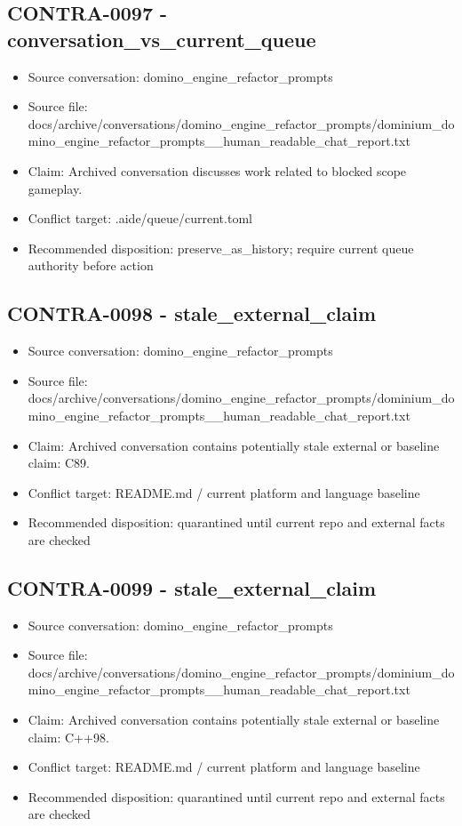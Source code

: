 \documentclass[11pt,a4paper]{report}
\begin{document}
\subsection{CONTRA-0097 - conversation\_vs\_current\_queue}

\begin{itemize}
\item Source conversation: domino\_engine\_refactor\_prompts
\item Source file: docs/archive/conversations/domino\_engine\_refactor\_prompts/dominium\_domino\_engine\_refactor\_prompts\_\_human\_readable\_chat\_report.txt
\item Claim: Archived conversation discusses work related to blocked scope gameplay.
\item Conflict target: .aide/queue/current.toml
\item Recommended disposition: preserve\_as\_history; require current queue authority before action
\end{itemize}

\subsection{CONTRA-0098 - stale\_external\_claim}

\begin{itemize}
\item Source conversation: domino\_engine\_refactor\_prompts
\item Source file: docs/archive/conversations/domino\_engine\_refactor\_prompts/dominium\_domino\_engine\_refactor\_prompts\_\_human\_readable\_chat\_report.txt
\item Claim: Archived conversation contains potentially stale external or baseline claim: C89.
\item Conflict target: README.md / current platform and language baseline
\item Recommended disposition: quarantined until current repo and external facts are checked
\end{itemize}

\subsection{CONTRA-0099 - stale\_external\_claim}

\begin{itemize}
\item Source conversation: domino\_engine\_refactor\_prompts
\item Source file: docs/archive/conversations/domino\_engine\_refactor\_prompts/dominium\_domino\_engine\_refactor\_prompts\_\_human\_readable\_chat\_report.txt
\item Claim: Archived conversation contains potentially stale external or baseline claim: C++98.
\item Conflict target: README.md / current platform and language baseline
\item Recommended disposition: quarantined until current repo and external facts are checked
\end{itemize}
\end{document}

